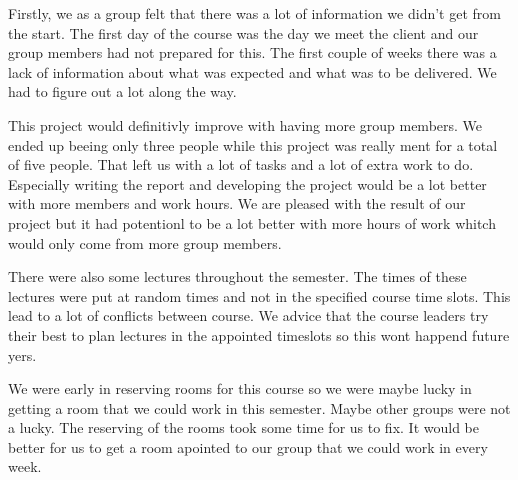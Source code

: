 Firstly, we as a group felt that there was a lot of information we didn't get from the start. 
The first day of the course was the day we meet the client and our group members had not prepared for this.
The first couple of weeks there was a lack of information about what was expected and what was to be delivered.
We had to figure out a lot along the way.

This project would definitivly improve with having more group members. 
We ended up beeing only three people while this project was really ment for a total of five people.
That left us with a lot of tasks and a lot of extra work to do.
Especially writing the report and developing the project would be a lot better with more members and work hours. 
We are pleased with the result of our project but it had potentionl to be a lot better with more hours of work whitch would only come from more group members. 

There were also some lectures throughout the semester. The times of these lectures were put at random times and not in the specified course time slots.
This lead to a lot of conflicts between course.
We advice that the course leaders try their best to plan lectures in the appointed timeslots so this wont happend future yers. 

We were early in reserving rooms for this course so we were maybe lucky in getting a room that we could work in this semester. Maybe other groups were not a lucky. 
The reserving of the rooms took some time for us to fix. 
It would be better for us to get a room apointed to our group that we could work in every week. 

